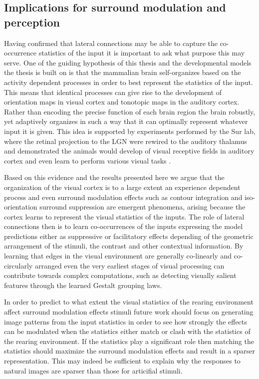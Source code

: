 \subsection{Implications for surround modulation and perception}

Having confirmed that lateral connections may be able to capture the
co-occurrence statistics of the input it is important to ask what
purpose this may serve. One of the guiding hypothesis of this thesis
and the developmental models the thesis is built on is that the
mammalian brain self-organizes based on the activity dependent
processes in order to best represent the statistics of the input. This
means that identical processes can give rise to the development of
orientation maps in visual cortex and tonotopic maps in the auditory
cortex. Rather than encoding the precise function of each brain region
the brain robustly, yet adaptively organizes in such a way that it can
optimally represent whatever input it is given. This idea is supported
by experiments performed by the Sur lab, where the retinal projection
to the LGN were rewired to the auditory thalamus and demonstrated the
animals would develop of visual receptive fields in auditory cortex
and even learn to perform various visual tasks
\citep{vonMelchner2000}.

Based on this evidence and the results presented here we argue that
the organization of the visual cortex is to a large extent an
experience dependent process and even surround modulation effects such
as contour integration and iso-orientation surround suppression are
emergent phenomena, arising because the cortex learns to represent the
visual statistics of the inputs. The role of lateral connections then
is to learn co-occurrences of the inputs expressing the model
predictions either as suppressive or facilitatory effects depending of
the geometric arrangement of the stimuli, the contrast and other
contextual information. By learning that edges in the visual
environment are generally co-linearly and co-circularly arranged even
the very earliest stages of visual processing can contribute towards
complex computations, such as detecting visually salient features
through the learned Gestalt grouping laws.

In order to predict to what extent the visual statistics of the
rearing environment affect surround modulation effects stimuli future
work should focus on generating image patterns from the input
statistics in order to see how strongly the effects can be modulated
when the statistics either match or clash with the statistics of the
rearing environment. If the statistics play a significant role then
matching the statistics should maximize the surround modulation
effects and result in a sparser representation. This may indeed be
sufficient to explain why the responses to natural images are sparser
than those for articifial stimuli.

